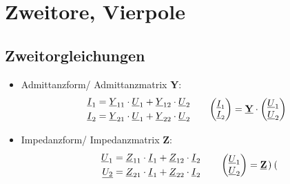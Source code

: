 \clearpage
\section{Zweitore, Vierpole}
\subsection{Zweitorgleichungen}
    \begin{itemize}[leftmargin=*]
        \item{Admittanzform/ Admittanzmatrix \textbf{Y}:}
        \begin{align*}
            \begin{split}
                \underline{I}_1 &= \underline{Y}_{11}\cdot\underline{U}_1 + \underline{Y}_{12}\cdot\underline{U}_2\\
                \underline{I}_2 &= \underline{Y}_{21}\cdot\underline{U}_1 + \underline{Y}_{22}\cdot\underline{U}_2
            \end{split} \qquad
            {\small\begin{pmatrix}
                \underline{I}_1 \\
                \underline{I}_2
            \end{pmatrix}} = \textbf{\underline{Y}}\cdot
            \begin{pmatrix}
                \underline{U}_1 \\
                \underline{U}_2
            \end{pmatrix}      
        \end{align*}
        \item{Impedanzform/ Impedanzmatrix \textbf{Z}:}
            \begin{align*}
                \begin{split}
                \underline{U}_1 &=\underline{Z}_{11}\cdot\underline{I}_1 + \underline{Z}_{12}\cdot\underline{I}_2 \\
                \underline{U_2} &=\underline{Z}_{21}\cdot\underline{I}_1 + \underline{Z}_{22}\cdot\underline{I}_2
                \end{split}\qquad
                \begin{pmatrix}
                    \underline{U}_1 \\
                    \underline{U}_2
                \end{pmatrix} = \textbf{\underline{Z}}\cdot
                \begin{pmatrix}

\end{pmatrix}
\end{align*}
\end{itemize}
